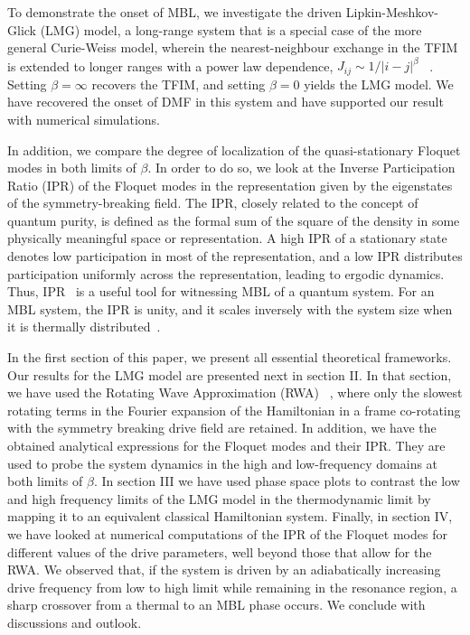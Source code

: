 \documentclass[%
reprint,
superscriptaddress,
amsmath,amssymb,
aps,
prb,
showkeys,
]{revtex4-2}
\begin{document}
	
	To demonstrate the onset of MBL, we investigate the driven Lipkin-Meshkov-Glick (LMG) model, a long-range system that is a special case of the more general Curie-Weiss model, wherein the nearest-neighbour exchange in the TFIM is extended to longer ranges with a power law dependence, $J_{ij}\sim 1/|i-j|^\beta$  ~\cite{campa_statistical_2009, eisele_multiple_1988, canning_class_1992}. Setting $\beta=\infty$ recovers the TFIM, and setting $\beta=0$ yields the LMG model. We have recovered the onset of DMF in this system and have supported our result with numerical simulations.
	
	In addition, we compare the degree of localization of the quasi-stationary Floquet modes in both limits of $\beta$. In order to do so, we look at the Inverse Participation Ratio (IPR) of the Floquet modes in the representation given by the eigenstates of the symmetry-breaking field. The IPR, closely related to the concept of quantum purity, is defined as the formal sum of the square of the density in some physically meaningful space or representation. A high IPR of a stationary state denotes low participation in most of the representation, and a low IPR distributes participation uniformly across the representation, leading to ergodic dynamics\cite{vu_fermionic_2022}. Thus, IPR~\cite{Misguich2016} is a useful tool for witnessing MBL of a quantum system. For an MBL system, the IPR is unity, and it scales inversely with the system size when it is thermally distributed~\cite{calixto_inverse_2015}.
	
	In the first section of this paper, we present all essential theoretical frameworks. Our results for the LMG model are presented next in section II. In that section, we have used the Rotating Wave Approximation (RWA) ~\cite{fujii_introduction_2017}, where only the slowest rotating terms in the Fourier expansion of the Hamiltonian in a frame co-rotating with the symmetry breaking drive field are retained. In addition, we have the obtained analytical expressions for the Floquet modes and their IPR. They are used to probe the system dynamics in the high and low-frequency domains at both limits of $\beta$. In section III we have used phase space plots to contrast the low and high frequency limits of the LMG model in the thermodynamic limit by mapping it to an equivalent classical Hamiltonian system. Finally, in section IV, we have looked at numerical computations of the IPR of the Floquet modes for different values of the drive parameters, well beyond those that allow for the RWA. We observed that, if the system is driven by an adiabatically increasing drive frequency from low to high limit while remaining in the resonance region, a sharp crossover from a thermal to an MBL phase occurs. We conclude with discussions and outlook.
	
\end{document}

